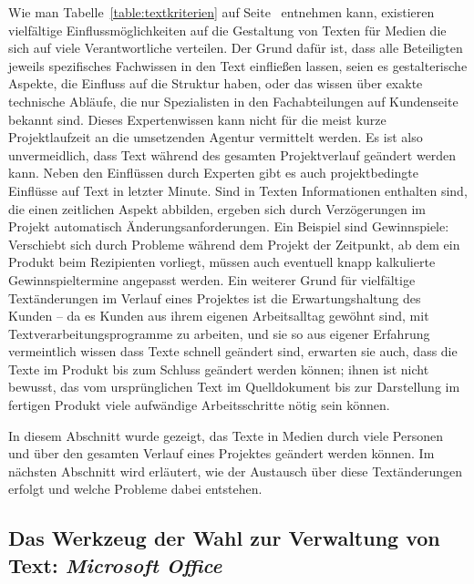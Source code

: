 Wie man Tabelle~\ref{table:textkriterien} auf Seite~\pageref{table:textkriterien} entnehmen kann, existieren vielfältige Einflussmöglichkeiten auf die Gestaltung von Texten für Medien die sich auf viele Verantwortliche verteilen. Der Grund dafür ist, dass alle Beteiligten jeweils spezifisches Fachwissen in den Text einfließen lassen, seien es gestalterische Aspekte, die Einfluss auf die Struktur haben, oder das wissen über exakte technische Abläufe, die nur Spezialisten in den Fachabteilungen auf Kundenseite bekannt sind. Dieses Expertenwissen kann nicht für die meist kurze Projektlaufzeit an die umsetzenden Agentur vermittelt werden. Es ist also unvermeidlich, dass Text während des gesamten Projektverlauf geändert werden kann. Neben den Einflüssen durch Experten gibt es auch projektbedingte Einflüsse auf Text in letzter Minute. Sind in Texten Informationen enthalten sind, die einen zeitlichen Aspekt abbilden, ergeben sich durch Verzögerungen im Projekt automatisch Änderungsanforderungen. Ein Beispiel sind Gewinnspiele: Verschiebt sich durch Probleme während dem Projekt der Zeitpunkt, ab dem ein Produkt beim Rezipienten vorliegt, müssen auch eventuell knapp kalkulierte Gewinnspieltermine angepasst werden. Ein weiterer Grund für vielfältige Textänderungen im Verlauf eines Projektes ist die Erwartungshaltung des Kunden -- da es Kunden aus ihrem eigenen Arbeitsalltag gewöhnt sind, mit Textverarbeitungsprogramme zu arbeiten, und sie so aus eigener Erfahrung vermeintlich wissen dass Texte schnell geändert sind, erwarten sie auch, dass die Texte im Produkt bis zum Schluss geändert werden können; ihnen ist nicht bewusst, das vom ursprünglichen Text im Quelldokument bis zur Darstellung im fertigen Produkt viele aufwändige Arbeitsschritte nötig sein können.

\bigskip

In diesem Abschnitt wurde gezeigt, das Texte in Medien durch viele Personen und über den gesamten Verlauf eines Projektes geändert werden können. Im nächsten Abschnitt wird erläutert, wie der Austausch über diese Textänderungen erfolgt und welche Probleme dabei entstehen.

\subsection{Das Werkzeug der Wahl zur Verwaltung von Text: \emph{Microsoft Office}}

